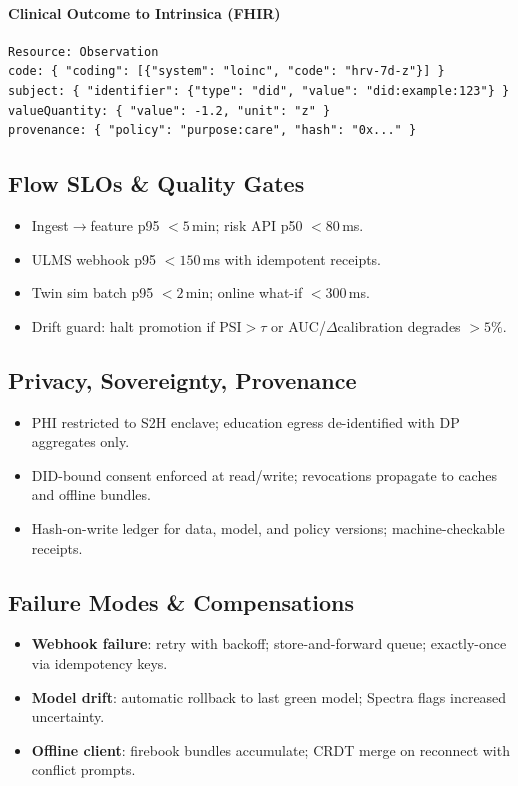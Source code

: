 \documentclass[11pt]{article}
\theoremstyle{plain}
\begin{document}
\paragraph{Clinical Outcome to Intrinsica (FHIR)}
\begin{verbatim}
Resource: Observation
code: { "coding": [{"system": "loinc", "code": "hrv-7d-z"}] }
subject: { "identifier": {"type": "did", "value": "did:example:123"} }
valueQuantity: { "value": -1.2, "unit": "z" }
provenance: { "policy": "purpose:care", "hash": "0x..." }
\end{verbatim}

\subsection{Flow SLOs \& Quality Gates}
\begin{itemize}
  \item Ingest$\rightarrow$feature p95 $<5$\,min; risk API p50 $<80$\,ms.
  \item ULMS webhook p95 $<150$\,ms with idempotent receipts.
  \item Twin sim batch p95 $<2$\,min; online what-if $<300$\,ms.
  \item Drift guard: halt promotion if PSI$>$\(\tau\) or AUC/$\Delta$calibration degrades $>5\%$.
\end{itemize}

\subsection{Privacy, Sovereignty, Provenance}
\begin{itemize}
  \item PHI restricted to S2H enclave; education egress de-identified with DP aggregates only.
  \item DID-bound consent enforced at read/write; revocations propagate to caches and offline bundles.
  \item Hash-on-write ledger for data, model, and policy versions; machine-checkable receipts.
\end{itemize}

\subsection{Failure Modes \& Compensations}
\begin{itemize}
  \item \textbf{Webhook failure}: retry with backoff; store-and-forward queue; exactly-once via idempotency keys.
  \item \textbf{Model drift}: automatic rollback to last green model; Spectra flags increased uncertainty.
  \item \textbf{Offline client}: firebook bundles accumulate; CRDT merge on reconnect with conflict prompts.
\end{itemize}
\end{document}
